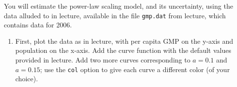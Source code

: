 \documentclass[
]{article}
\newenvironment{Shaded}{\begin{snugshade}}{\end{snugshade}}
\newcommand{\DataTypeTok}[1]{\textcolor[rgb]{0.13,0.29,0.53}{#1}}
\newcommand{\DecValTok}[1]{\textcolor[rgb]{0.00,0.00,0.81}{#1}}
\newcommand{\FloatTok}[1]{\textcolor[rgb]{0.00,0.00,0.81}{#1}}
\newcommand{\KeywordTok}[1]{\textcolor[rgb]{0.13,0.29,0.53}{\textbf{#1}}}
\newcommand{\NormalTok}[1]{#1}
\newcommand{\OperatorTok}[1]{\textcolor[rgb]{0.81,0.36,0.00}{\textbf{#1}}}
\newcommand{\StringTok}[1]{\textcolor[rgb]{0.31,0.60,0.02}{#1}}
\providecommand{\tightlist}{%
  \setlength{\itemsep}{0pt}\setlength{\parskip}{0pt}}
\begin{document}
You will estimate the power-law scaling model, and its uncertainty,
using the data alluded to in lecture, available in the file
\texttt{gmp.dat} from lecture, which contains data for 2006.

\begin{Shaded}
\end{Shaded}

\begin{enumerate}
\def\labelenumi{\arabic{enumi}.}
\tightlist
\item
  First, plot the data as in lecture, with per capita GMP on the y-axis
  and population on the x-axis. Add the curve function with the default
  values provided in lecture. Add two more curves corresponding to
  \(a=0.1\) and \(a=0.15\); use the \texttt{col} option to give each
  curve a different color (of your choice).
\end{enumerate}

\begin{Shaded}
\end{Shaded}
\end{document}

